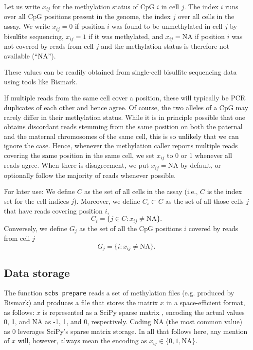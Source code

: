 \documentclass[twocolumn,10pt]{article}
\begin{document}
Let us write $x_{ij}$ for the methylation status of CpG $i$ in cell $j$.
The index $i$ runs over all CpG positions present in the genome, the index $j$ over all cells in the assay.
We write $x_{ij}=0$ if position $i$ was found to be unmethylated in cell $j$ by bisulfite sequencing, $x_{ij}=1$ if it was methylated, and $x_{ij}=\text{NA}$ if position $i$ was not covered by reads from cell $j$ and the methylation status is therefore not available (``NA'').

These values can be readily obtained from single-cell bisulfite sequencing data using tools like Bismark.

If multiple reads from the same cell cover a position, these will typically be PCR duplicates of each other and hence agree.
Of course, the two alleles of a CpG may rarely differ in their methylation status.
While it is in principle possible that one obtains discordant reads stemming from the same position on both the paternal and the maternal chromosomes of the same cell, this is so unlikely that we can ignore the case.
Hence, whenever the methylation caller reports multiple reads covering the same position in the same cell, we set $x_{ij}$ to 0 or 1 whenever all reads agree.
When there is disagreement, we put $x_{ij}=\text{NA}$ by default, or optionally follow the majority of reads whenever possible.

For later use: We define $C$ as the set of all cells in the assay (i.e., $C$ is the index set for the cell indices $j$).
Moreover, we define $C_i\subset C$ as the set of all those cells $j$ that have reads covering position $i$,
\[ C_i=\{j\in C: x_{ij}\neq\text{NA}\}.\]
Conversely, we define $G_j$ as the set of all the CpG positions $i$ covered by reads from cell $j$ 
\[ G_j=\{i: x_{ij}\neq\text{NA}\}.\]

\subsection{Data storage}

The function \texttt{scbs prepare} reads a set of methylation files (e.g. produced by Bismark) and produces a file that stores the matrix $x$ in a space-efficient format, as follows:
$x$ is represented as a SciPy sparse matrix \citep{SciPy}, encoding the actual values 0, 1, and NA as -1, 1, and 0, respectively.
Coding NA (the most common value) as 0 leverages SciPy's sparse matrix storage.
In all that follows here, any mention of $x$ will, however, always mean the encoding as $x_{ij}\in\{0,1,\text{NA}\}$.
\end{document}
